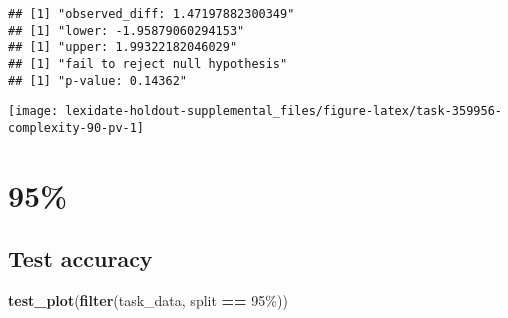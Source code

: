 \documentclass[
]{book}
\newenvironment{Shaded}{\begin{snugshade}}{\end{snugshade}}
\newcommand{\AttributeTok}[1]{\textcolor[rgb]{0.13,0.29,0.53}{#1}}
\newcommand{\DecValTok}[1]{\textcolor[rgb]{0.00,0.00,0.81}{#1}}
\newcommand{\FunctionTok}[1]{\textcolor[rgb]{0.13,0.29,0.53}{\textbf{#1}}}
\newcommand{\NormalTok}[1]{#1}
\newcommand{\OtherTok}[1]{\textcolor[rgb]{0.56,0.35,0.01}{#1}}
\newcommand{\SpecialCharTok}[1]{\textcolor[rgb]{0.81,0.36,0.00}{\textbf{#1}}}
\newcommand{\StringTok}[1]{\textcolor[rgb]{0.31,0.60,0.02}{#1}}
\begin{document}
\begin{Shaded}
\end{Shaded}

\begin{verbatim}
## [1] "observed_diff: 1.47197882300349"
## [1] "lower: -1.95879060294153"
## [1] "upper: 1.99322182046029"
## [1] "fail to reject null hypothesis"
## [1] "p-value: 0.14362"
\end{verbatim}

\texttt{[image: lexidate-holdout-supplemental\_files/figure-latex/task-359956-complexity-90-pv-1]}

\hypertarget{section-29}{%
\section{95\%}\label{section-29}}

\hypertarget{test-accuracy-29}{%
\subsection{Test accuracy}\label{test-accuracy-29}}

\begin{Shaded}
\begin{Highlighting}[]
\FunctionTok{test\_plot}\NormalTok{(}\FunctionTok{filter}\NormalTok{(task\_data, split }\SpecialCharTok{==} \StringTok{\textquotesingle{}95\%\textquotesingle{}}\NormalTok{))}
\end{Highlighting}
\end{Shaded}
\end{document}

